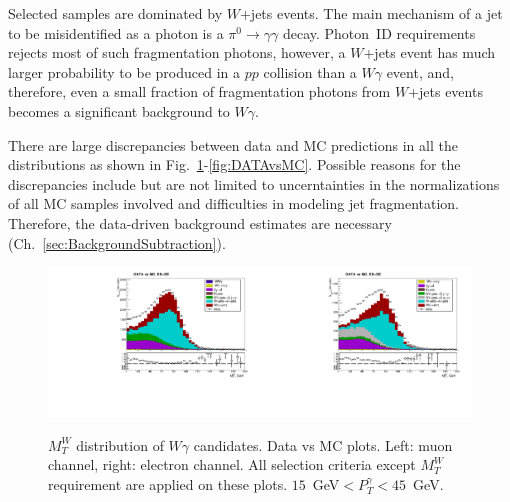 Selected samples are dominated by $W$+jets events. The main mechanism of a jet to be misidentified as a photon is a $\pi^0 \rightarrow \gamma\gamma$ decay. Photon~ID requirements rejects most of such fragmentation photons, however, a $W$+jets event has much larger probability to be produced in a $pp$ collision than a $W\gamma$ event, and, therefore, even a small fraction of fragmentation photons from $W$+jets events becomes a significant background to $W\gamma$.  

There are large discrepancies between data and MC predictions in all the distributions as shown in Fig.~\ref{fig:DATAvsMC_WMt}-\ref{fig:DATAvsMC}. Possible reasons for the discrepancies include but are not limited to uncerntainties in the normalizations of all MC samples involved and difficulties in modeling jet fragmentation. Therefore, the data-driven background estimates are necessary (Ch.~\ref{sec:BackgroundSubtraction}).

\begin{figure}[htb]
  \begin{center}
   \includegraphics[width=0.5\textwidth]{../figs/figs_v11/MUON_WGamma/PrepareYields/c_TotalDATAvsMC_EtaCommon__WMtVERY_PRELIMINARY.pdf}\includegraphics[width=0.5\textwidth]{../figs/figs_v11/ELECTRON_WGamma/PrepareYields/c_TotalDATAvsMC_EtaCommon__WMtVERY_PRELIMINARY.pdf}
  \caption{ $M_T^W$ distribution of $W\gamma$ candidates. Data vs MC plots. Left: muon channel, right: electron channel. All selection criteria except $M_{T}^W$ requirement are applied on these plots. $15$~GeV$<P_T^{\gamma}<45$~GeV. }
  \label{fig:DATAvsMC_WMt}
  \end{center}
\end{figure}

